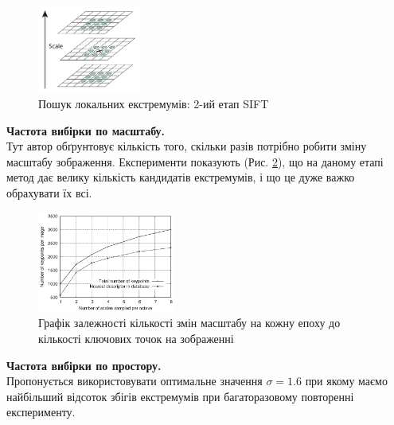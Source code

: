 \begin{enumerate}
          \begin{figure}[H]
              \centering
              \includegraphics[width=0.3\textwidth]{images/sift2}
              \caption{Пошук локальних екстремумів: 2-ий етап SIFT \cite{sift}
                  \label{fig:swift2}
              }
          \end{figure}

          \subitem \textbf{Частота вибірки по масштабу.} \\
          Тут автор обґрунтовує кількість того, скільки разів потрібно робити
          зміну масштабу зображення. Експерименти показують (Рис. \ref{fig:swift3}),
          що на даному етапі метод дає велику кількість кандидатів екстремумів,
          і що це дуже важко обрахувати їх всі.

          \begin{figure}[H]
              \centering
              \includegraphics[width=0.4\textwidth]{images/sift3}
              \caption{Графік залежності кількості змін масштабу на кожну епоху до
                  кількості ключових точок на зображенні  \cite{sift}
                  \label{fig:swift3}
              }
          \end{figure}

          \subitem \textbf{Частота вибірки по простору.} \\
          Пропонується використовувати оптимальне значення $\sigma = 1.6$ при якому
          маємо найбільший відсоток збігів екстремумів при багаторазовому повторенні
          експерименту.


\end{enumerate}
